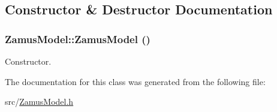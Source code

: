 \subsection{Constructor \& Destructor Documentation}
\hypertarget{classZamusModel_a0ad8a2247c734fc57b02a0ecd858e64b}{
\subsubsection[{ZamusModel}]{\setlength{\rightskip}{0pt plus 5cm}ZamusModel::ZamusModel ()}}
\label{classZamusModel_a0ad8a2247c734fc57b02a0ecd858e64b}
Constructor. 

The documentation for this class was generated from the following file:\begin{DoxyCompactItemize}
\item 
src/\hyperlink{ZamusModel_8h}{ZamusModel.h}\end{DoxyCompactItemize}
